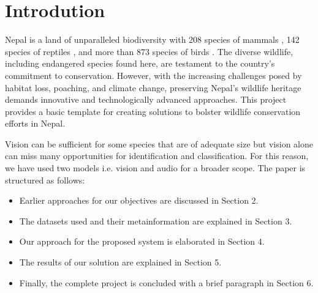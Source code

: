 \documentclass[fleqn, 10pt, twoside]{IOEGC}
\begin{document}
\maketitle
\thispagestyle{firstpage}

\section{Introdution}
Nepal is a land of unparalleled biodiversity with 208 species of mammals \cite{r1}, 142 species of reptiles \cite{r2}, and more than 873 species of birds \cite{r3}. The diverse wildlife, including endangered species found here, are testament to the country’s commitment to conservation. However, with the increasing challenges posed
by habitat loss, poaching, and climate change, preserving Nepal’s wildlife heritage demands innovative and technologically advanced approaches.
This project provides a basic template for creating solutions to bolster wildlife conservation efforts in Nepal.
\par
Vision can be sufficient for some species that are of adequate size but vision alone can miss many opportunities for identification and classification. For this reason, we have used two models i.e. vision and audio for a broader scope.
The paper is structured as follows:
\begin{itemize}
	\item Earlier approaches for our objectives are discussed in Section 2.
	\item The datasets used and their metainformation are explained in Section 3.
	\item Our approach for the proposed system is elaborated in Section 4.
	\item The results of our solution are explained in Section 5.
	\item Finally, the complete project is concluded with a brief paragraph in Section 6.
\end{itemize}
\end{document}
